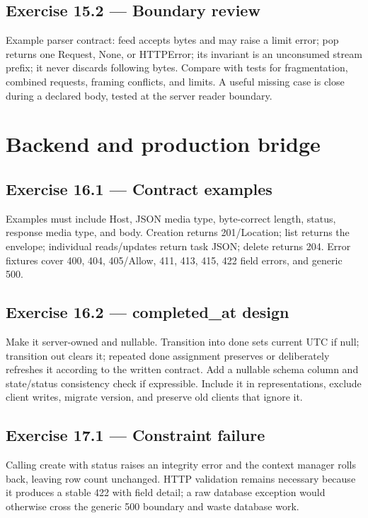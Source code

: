\subsection*{Exercise 15.2 --- Boundary review}

Example parser contract: feed accepts bytes and may raise a limit error; pop
returns one Request, None, or HTTPError; its invariant is an unconsumed stream
prefix; it never discards following bytes. Compare with tests for fragmentation,
combined requests, framing conflicts, and limits. A useful missing case is close
during a declared body, tested at the server reader boundary.

\section{Backend and production bridge}

\subsection*{Exercise 16.1 --- Contract examples}

Examples must include Host, JSON media type, byte-correct length, status, response
media type, and body. Creation returns 201/Location; list returns the envelope;
individual reads/updates return task JSON; delete returns 204. Error fixtures
cover 400, 404, 405/Allow, 411, 413, 415, 422 field errors, and generic 500.

\subsection*{Exercise 16.2 --- completed\_at design}

Make it server-owned and nullable. Transition into done sets current UTC if null;
transition out clears it; repeated done assignment preserves or deliberately
refreshes it according to the written contract. Add a nullable schema column and
state/status consistency check if expressible. Include it in representations,
exclude client writes, migrate version, and preserve old clients that ignore it.

\subsection*{Exercise 17.1 --- Constraint failure}

Calling create with status  raises an integrity error and the context
manager rolls back, leaving row count unchanged. HTTP validation remains necessary
because it produces a stable 422 with field detail; a raw database exception would
otherwise cross the generic 500 boundary and waste database work.

